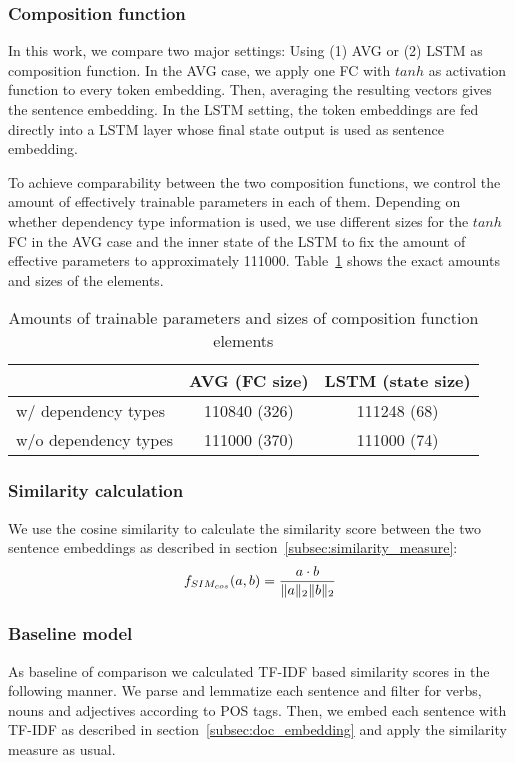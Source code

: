 \subsubsection{Composition function}
In this work, we compare two major settings: Using (1) \acf{AVG} or (2) \acf{LSTM} as composition function. 
In the \ac{AVG} case, we apply one \acf{FC} with $tanh$ as activation function to every token embedding. Then, averaging the resulting vectors gives the sentence embedding.
In the \ac{LSTM} setting, the token embeddings are fed directly into a LSTM layer whose final state output is used as sentence embedding. %

To achieve comparability between the two composition functions, we control the amount of effectively trainable parameters in each of them. Depending on whether dependency type information is used, we use different sizes for the $tanh$ \ac{FC} in the \ac{AVG} case and the inner state of the \ac{LSTM} to fix the amount of effective parameters to approximately 111000. Table~\ref{tab:sizes} shows the exact amounts and sizes of the elements. %

\begin{table}[!htb]
  \centering
  \begin{tabular}{ l | c | c }
      & AVG (FC size) & LSTM (state size) \\ \hline
    w/ dependency types & 110840 (326) & 111248 (68) \\ 
    w/o dependency types & 111000 (370) & 111000 (74) \\
  \end{tabular}
  \caption{Amounts of trainable parameters and sizes of composition function elements}
  \label{tab:sizes}
\end{table}

\subsubsection{Similarity calculation}
We use the cosine similarity to calculate the similarity score between the two sentence embeddings as described in section~\ref{subsec:similarity_measure}:
\begin{equation}
f_{SIM_{cos}}(a,b) = \frac{a \cdot b}{\lVert a\rVert_2\lVert b\rVert_2} 
\end{equation}

\subsubsection{Baseline model}
As baseline of comparison we calculated TF-IDF based similarity scores in the following manner. We parse and lemmatize each sentence and filter for verbs, nouns and adjectives according to POS tags. Then, we embed each sentence with TF-IDF as described in section~\ref{subsec:doc_embedding} and apply the similarity measure as usual. 

